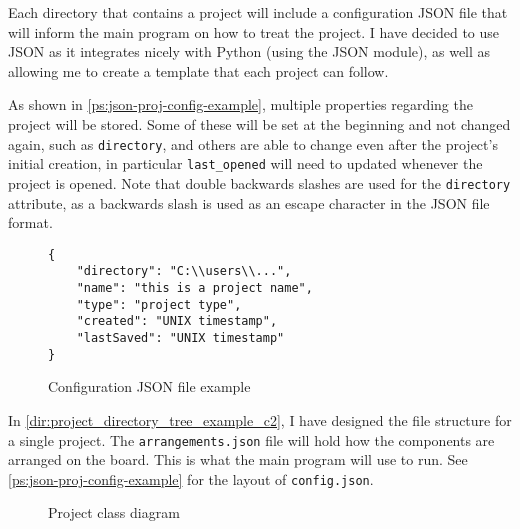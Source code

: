         Each directory that contains a project will include a configuration JSON file that will inform the main program on how to treat the project. I have decided to use JSON as it integrates nicely with Python (using the JSON module), as well as allowing me to create a template that each project can follow. 


        As shown in \autoref{ps:json-proj-config-example}, multiple properties regarding the project will be stored. Some of these will be set at the beginning and not changed again, such as \verb|directory|, and others are able to change even after the project's initial creation, in particular \verb|last_opened| will need to updated whenever the project is opened. Note that double backwards slashes are used for the \verb|directory| attribute, as a backwards slash is used as an escape character in the JSON file format.

        \begin{figure}[!ht]
            \begin{verbatim}
{
    "directory": "C:\\users\\...",
    "name": "this is a project name",
    "type": "project type",
    "created": "UNIX timestamp",
    "lastSaved": "UNIX timestamp"
}
            \end{verbatim}
            \caption{Configuration JSON file example}
            \label{ps:json-proj-config-example}
        \end{figure}


        In \autoref{dir:project_directory_tree_example_c2}, I have designed the file structure for a single project. 
        The \verb|arrangements.json| file will hold how the components are arranged on the board. This is what the main program will use to run. 
        See \autoref{ps:json-proj-config-example} for the layout of \verb|config.json|.


        \begin{figure}[!ht]
            \centering
            \caption{Project class diagram}
            \label{fig:project-class-diagram-c2}
        \end{figure}

